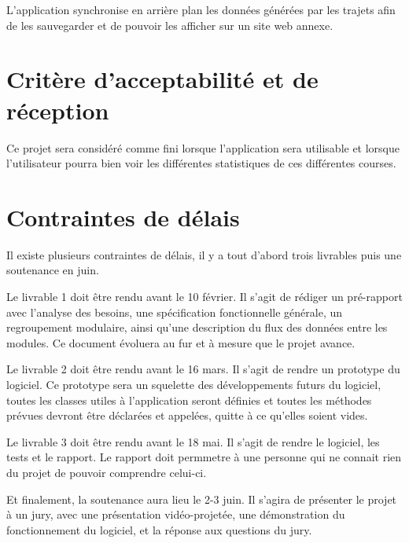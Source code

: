 L'application synchronise en arrière plan les données générées par les trajets afin de les sauvegarder et de pouvoir les afficher sur un site web annexe.

\section{Critère d’acceptabilité et de réception }

Ce projet sera considéré comme fini lorsque l’application sera utilisable et lorsque l’utilisateur pourra bien voir les différentes statistiques de ces différentes courses.

\section{Contraintes de délais}

Il existe plusieurs contraintes de délais, il y a tout d'abord trois livrables puis une soutenance en juin.

Le livrable 1 doit être rendu avant le 10 février. Il s'agit de rédiger un pré-rapport avec l'analyse des besoins, une spécification fonctionnelle générale, un regroupement modulaire, ainsi qu'une description du flux des données entre les modules. Ce document évoluera au fur et à mesure que le projet avance.

Le livrable 2 doit être rendu avant le 16 mars. Il s'agit de rendre un prototype du logiciel. Ce prototype sera un squelette des développements futurs du logiciel, toutes les classes utiles à l'application seront définies et toutes les méthodes prévues devront être déclarées et appelées, quitte à ce qu'elles soient vides.

Le livrable 3 doit être rendu avant le 18 mai. Il s'agit de rendre le logiciel, les tests et le rapport. Le rapport doit permmetre à une personne qui ne connait rien du projet de pouvoir comprendre celui-ci.

Et finalement, la soutenance aura lieu le 2-3 juin. Il s'agira de présenter le projet à un jury, avec une présentation vidéo-projetée, une démonstration du fonctionnement du logiciel, et la réponse aux questions du jury.